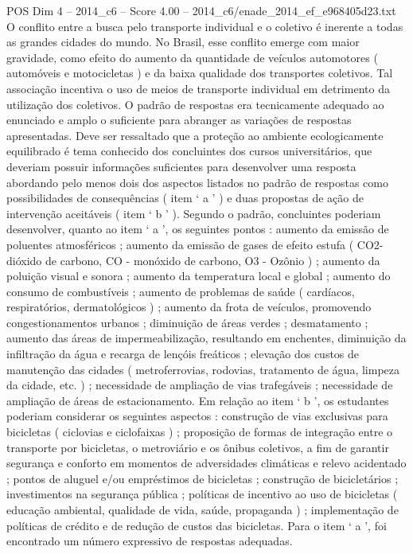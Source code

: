 \begin{textsample}{POS Dim 4 – 2014\_c6 – Score 4.00 – 2014\_c6/enade\_2014\_ef\_e968405d23.txt}
O conflito entre a busca pelo transporte individual e o coletivo é inerente a todas as grandes cidades do mundo.
No Brasil, esse conflito emerge com maior gravidade, como efeito do aumento da quantidade de veículos automotores ( automóveis e motocicletas ) e da baixa qualidade dos transportes coletivos.
Tal associação incentiva o uso de meios de transporte individual em detrimento da utilização dos coletivos.
O padrão de respostas era tecnicamente adequado ao enunciado e amplo o suficiente para abranger as variações de respostas apresentadas.
Deve ser ressaltado que a proteção ao ambiente ecologicamente equilibrado é tema conhecido dos concluintes dos cursos universitários, que deveriam possuir informações suficientes para desenvolver uma resposta abordando pelo menos dois dos aspectos listados no padrão de respostas como possibilidades de consequências ( item ‘ a ’ ) e duas propostas de ação de intervenção aceitáveis ( item ‘ b ’ ).
Segundo o padrão, concluintes poderiam desenvolver, quanto ao item ‘ a ’, os seguintes pontos : aumento da emissão de poluentes atmosféricos ; aumento da emissão de gases de efeito estufa ( CO2- dióxido de carbono, CO - monóxido de carbono, O3 - Ozônio ) ; aumento da poluição visual e sonora ; aumento da temperatura local e global ; aumento do consumo de combustíveis ; aumento de problemas de saúde ( cardíacos, respiratórios, dermatológicos ) ; aumento da frota de veículos, promovendo congestionamentos urbanos ; diminuição de áreas verdes ; desmatamento ; aumento das áreas de impermeabilização, resultando em enchentes, diminuição da infiltração da água e recarga de lençóis freáticos ; elevação dos custos de manutenção das cidades ( metroferrovias, rodovias, tratamento de água, limpeza da cidade, etc. ) ; necessidade de ampliação de vias trafegáveis ; necessidade de ampliação de áreas de estacionamento.
Em relação ao item ‘ b ’, os estudantes poderiam considerar os seguintes aspectos : construção de vias exclusivas para bicicletas ( ciclovias e ciclofaixas ) ; proposição de formas de integração entre o transporte por bicicletas, o metroviário e os ônibus coletivos, a fim de garantir segurança e conforto em momentos de adversidades climáticas e relevo acidentado ; pontos de aluguel e/ou empréstimos de bicicletas ; construção de bicicletários ; investimentos na segurança pública ; políticas de incentivo ao uso de bicicletas ( educação ambiental, qualidade de vida, saúde, propaganda ) ; implementação de políticas de crédito e de redução de custos das bicicletas.
Para o item ‘ a ’, foi encontrado um número expressivo de respostas adequadas.

\end{textsample}
